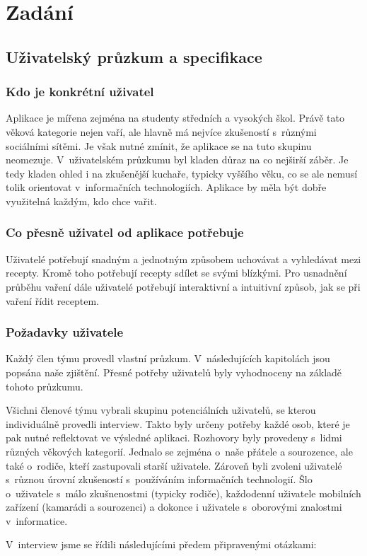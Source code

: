 \documentclass[a4paper, 11pt]{article}
\newcommand{\sss}[1]{\subsubsection{#1}} %
\begin{document}
    \section{Zadání}


    \subsection{Uživatelský průzkum a specifikace}
    
    \sss{Kdo je konkrétní uživatel}

    Aplikace je mířena zejména na studenty středních a vysokých škol. Právě tato věková kategorie
    nejen vaří, ale hlavně má nejvíce zkušeností s~různými sociálními sítěmi. Je však
    nutné zmínit, že aplikace se na tuto skupinu neomezuje. V~uživatelském průzkumu
    byl kladen důraz na co nejširší záběr. Je tedy kladen ohled i na zkušenější kuchaře, typicky
    vyššího věku, co se ale nemusí tolik orientovat v~informačních technologiích.
    Aplikace by měla být dobře využitelná každým, kdo chce vařit.

    \sss{Co přesně uživatel od aplikace potřebuje}

    Uživatelé potřebují snadným a jednotným způsobem uchovávat a vyhledávat mezi recepty. Kromě toho
    potřebují recepty sdílet se svými blízkými. Pro usnadnění průběhu vaření dále uživatelé
    potřebují interaktivní a intuitivní způsob, jak se při vaření řídit receptem.

    \sss{Požadavky uživatele}

    Každý člen týmu provedl vlastní průzkum. V~následujících kapitolách jsou popsána naše zjištění.
    Přesné potřeby uživatelů byly vyhodnoceny na základě tohoto průzkumu.

    Všichni členové týmu vybrali skupinu potenciálních uživatelů, se kterou individuálně provedli interview.
    Takto byly určeny potřeby každé  osob, které je pak nutné reflektovat
    ve výsledné aplikaci. Rozhovory byly provedeny s~lidmi různých věkových kategorií. Jednalo se
    zejména o~naše přátele a sourozence, ale také o~rodiče, kteří zastupovali starší uživatele.
    Zároveň byli zvoleni uživatelé s~různou úrovní zkušeností s~používáním informačních
    technologií. Šlo o~uživatele s~málo zkušnenostmi (typicky rodiče), každodenní uživatele
    mobilních zařízení (kamarádi a sourozenci) a dokonce i uživatele s~oborovými znalostmi
    v~informatice.

    \newpage

    V~interview jsme se řídili následujícími předem připravenými otázkami:
\end{document}
